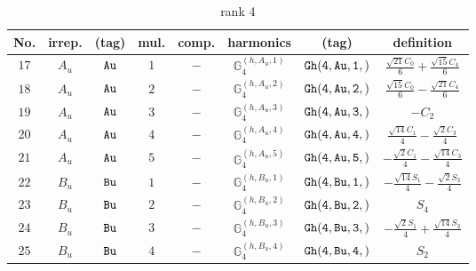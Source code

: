 \documentclass[fleqn,8pt]{jsarticle}
\begin{document}
\begin{table}[ht!]
\begin{center}
\caption{rank 4}
\renewcommand{\arraystretch}{1.3}
\begin{tabular}{cccccccc} \hline \hline
No. & irrep. & (tag) & mul. & comp. & harmonics & (tag) & definition \\ \hline
$ 17 $ & $ A_{u} $ & $ {\tt Au} $ & $ 1 $ & $ - $ & $ \mathbb{G}_{4}^{(h,A_{u},1)} $ & $ {\tt Gh(4,Au,1,)} $ & $ \frac{\sqrt{21} C_{0}}{6} + \frac{\sqrt{15} C_{4}}{6} $ \\
$ 18 $ & $ A_{u} $ & $ {\tt Au} $ & $ 2 $ & $ - $ & $ \mathbb{G}_{4}^{(h,A_{u},2)} $ & $ {\tt Gh(4,Au,2,)} $ & $ \frac{\sqrt{15} C_{0}}{6} - \frac{\sqrt{21} C_{4}}{6} $ \\
$ 19 $ & $ A_{u} $ & $ {\tt Au} $ & $ 3 $ & $ - $ & $ \mathbb{G}_{4}^{(h,A_{u},3)} $ & $ {\tt Gh(4,Au,3,)} $ & $ - C_{2} $ \\
$ 20 $ & $ A_{u} $ & $ {\tt Au} $ & $ 4 $ & $ - $ & $ \mathbb{G}_{4}^{(h,A_{u},4)} $ & $ {\tt Gh(4,Au,4,)} $ & $ \frac{\sqrt{14} C_{1}}{4} - \frac{\sqrt{2} C_{3}}{4} $ \\
$ 21 $ & $ A_{u} $ & $ {\tt Au} $ & $ 5 $ & $ - $ & $ \mathbb{G}_{4}^{(h,A_{u},5)} $ & $ {\tt Gh(4,Au,5,)} $ & $ - \frac{\sqrt{2} C_{1}}{4} - \frac{\sqrt{14} C_{3}}{4} $ \\
$ 22 $ & $ B_{u} $ & $ {\tt Bu} $ & $ 1 $ & $ - $ & $ \mathbb{G}_{4}^{(h,B_{u},1)} $ & $ {\tt Gh(4,Bu,1,)} $ & $ - \frac{\sqrt{14} S_{1}}{4} - \frac{\sqrt{2} S_{3}}{4} $ \\
$ 23 $ & $ B_{u} $ & $ {\tt Bu} $ & $ 2 $ & $ - $ & $ \mathbb{G}_{4}^{(h,B_{u},2)} $ & $ {\tt Gh(4,Bu,2,)} $ & $ S_{4} $ \\
$ 24 $ & $ B_{u} $ & $ {\tt Bu} $ & $ 3 $ & $ - $ & $ \mathbb{G}_{4}^{(h,B_{u},3)} $ & $ {\tt Gh(4,Bu,3,)} $ & $ - \frac{\sqrt{2} S_{1}}{4} + \frac{\sqrt{14} S_{3}}{4} $ \\
$ 25 $ & $ B_{u} $ & $ {\tt Bu} $ & $ 4 $ & $ - $ & $ \mathbb{G}_{4}^{(h,B_{u},4)} $ & $ {\tt Gh(4,Bu,4,)} $ & $ S_{2} $ \\
 \hline \hline
\end{tabular}
\end{center}
\end{table}
\end{document}
